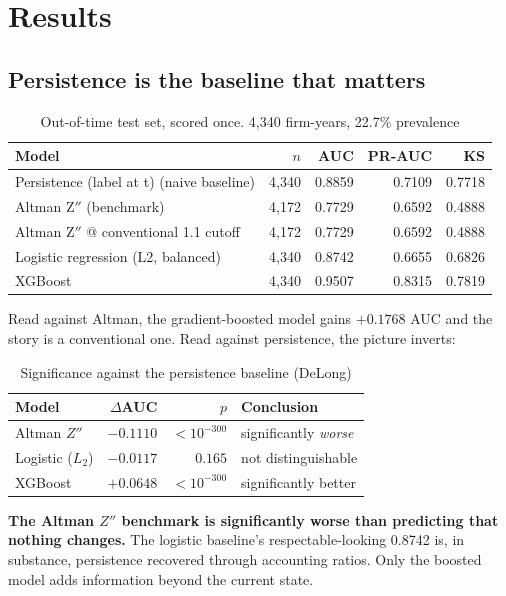\documentclass[conference]{IEEEtran}
\begin{document}
\section{Results}

\subsection{Persistence is the baseline that matters}

\begin{table}[htbp]
\caption{Out-of-time test set, scored once. 4,340 firm-years, 22.7\% prevalence}
\label{tab:main}
\centering
\begin{tabular}{lrrrr}
\toprule
Model & $n$ & AUC & PR-AUC & KS \\
\midrule
Persistence (label at t)  (naive baseline) & 4,340 & 0.8859 & 0.7109 & 0.7718 \\
Altman Z$''$ (benchmark) & 4,172 & 0.7729 & 0.6592 & 0.4888 \\
Altman Z$''$ @ conventional 1.1 cutoff & 4,172 & 0.7729 & 0.6592 & 0.4888 \\
Logistic regression (L2, balanced) & 4,340 & 0.8742 & 0.6655 & 0.6826 \\
XGBoost & 4,340 & 0.9507 & 0.8315 & 0.7819 \\
\bottomrule
\end{tabular}
\end{table}

Read against Altman, the gradient-boosted model gains $+0.1768$ AUC and the
story is a conventional one. Read against persistence, the picture inverts:

\begin{table}[htbp]
\caption{Significance against the persistence baseline (DeLong)}
\label{tab:sig}
\centering
\begin{tabular}{lrrl}
\toprule
Model & $\Delta$AUC & $p$ & Conclusion \\
\midrule
Altman $Z''$ & $-0.1110$ & $<10^{-300}$ & significantly \emph{worse} \\
Logistic ($L_2$) & $-0.0117$ & $0.165$ & not distinguishable \\
XGBoost & $+0.0648$ & $<10^{-300}$ & significantly better \\
\bottomrule
\end{tabular}
\end{table}

\textbf{The Altman $Z''$ benchmark is significantly worse than predicting that
nothing changes.} The logistic baseline's respectable-looking 0.8742 is, in
substance, persistence recovered through accounting ratios. Only the boosted
model adds information beyond the current state.
\end{document}
